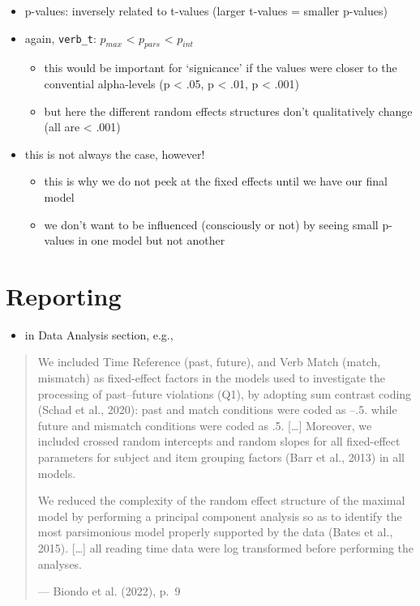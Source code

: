 \documentclass[
  letterpaper,
  DIV=11,
  numbers=noendperiod]{scrartcl}
\providecommand{\tightlist}{%
  \setlength{\itemsep}{0pt}\setlength{\parskip}{0pt}}\usepackage{longtable,booktabs,array}
\begin{document}
\begin{itemize}
\tightlist
\item
  p-values: inversely related to t-values (larger t-values = smaller
  p-values)
\item
  again, \texttt{verb\_t}: \(p_{max}\) \textless{} \(p_{pars}\)
  \textless{} \(p_{int}\)

  \begin{itemize}
  \tightlist
  \item
    this would be important for `signicance' if the values were closer
    to the convential alpha-levels (p \textless{} .05, p \textless{}
    .01, p \textless{} .001)
  \item
    but here the different random effects structures don't qualitatively
    change (all are \textless{} .001)
  \end{itemize}
\item
  this is not always the case, however!

  \begin{itemize}
  \tightlist
  \item
    this is why we do not peek at the fixed effects until we have our
    final model
  \item
    we don't want to be influenced (consciously or not) by seeing small
    p-values in one model but not another
  \end{itemize}
\end{itemize}

\hypertarget{reporting}{%
\section{Reporting}\label{reporting}}

\begin{itemize}
\tightlist
\item
  in Data Analysis section, e.g.,
\end{itemize}

\begin{quote}
We included Time Reference (past, future), and Verb Match (match,
mismatch) as fixed-effect factors in the models used to investigate the
processing of past--future violations (Q1), by adopting sum contrast
coding (Schad et al., 2020): past and match conditions were coded as
--.5. while future and mismatch conditions were coded as .5.
{[}\ldots{]} Moreover, we included crossed random intercepts and random
slopes for all fixed-effect parameters for subject and item grouping
factors (Barr et al., 2013) in all models.

We reduced the complexity of the random effect structure of the maximal
model by performing a principal component analysis so as to identify the
most parsimonious model properly supported by the data (Bates et al.,
2015). {[}\ldots{]} all reading time data were log transformed before
performing the analyses.

--- Biondo et al. (2022), p.~9
\end{quote}
\end{document}
